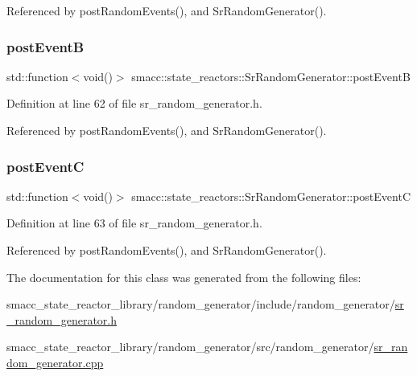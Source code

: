 Referenced by post\+Random\+Events(), and Sr\+Random\+Generator().

\mbox{\label{classsmacc_1_1state__reactors_1_1SrRandomGenerator_a0b38db23bf80e0709c2ae51c6a64ac1c}} 
\subsubsection{\texorpdfstring{post\+EventB}{postEventB}}
{\footnotesize\ttfamily std\+::function$<$void()$>$ smacc\+::state\+\_\+reactors\+::\+Sr\+Random\+Generator\+::post\+EventB\hspace{0.3cm}{\ttfamily [private]}}



Definition at line 62 of file sr\+\_\+random\+\_\+generator.\+h.



Referenced by post\+Random\+Events(), and Sr\+Random\+Generator().

\mbox{\label{classsmacc_1_1state__reactors_1_1SrRandomGenerator_a1aeb07de7b52a9f5811e5f60444731a0}} 
\subsubsection{\texorpdfstring{post\+EventC}{postEventC}}
{\footnotesize\ttfamily std\+::function$<$void()$>$ smacc\+::state\+\_\+reactors\+::\+Sr\+Random\+Generator\+::post\+EventC\hspace{0.3cm}{\ttfamily [private]}}



Definition at line 63 of file sr\+\_\+random\+\_\+generator.\+h.



Referenced by post\+Random\+Events(), and Sr\+Random\+Generator().



The documentation for this class was generated from the following files\+:\begin{DoxyCompactItemize}
\item 
smacc\+\_\+state\+\_\+reactor\+\_\+library/random\+\_\+generator/include/random\+\_\+generator/\hyperlink{sr__random__generator_8h}{sr\+\_\+random\+\_\+generator.\+h}\item 
smacc\+\_\+state\+\_\+reactor\+\_\+library/random\+\_\+generator/src/random\+\_\+generator/\hyperlink{sr__random__generator_8cpp}{sr\+\_\+random\+\_\+generator.\+cpp}\end{DoxyCompactItemize}
